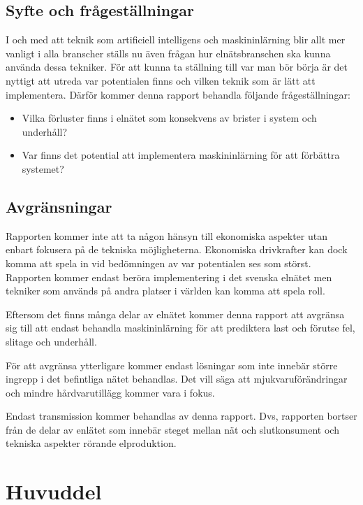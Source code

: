 \documentclass[a4paper]{article}
\begin{document}
\subsection{Syfte och frågeställningar}
I och med att teknik som artificiell intelligens och maskininlärning blir allt mer vanligt i alla branscher ställs nu även frågan hur elnätsbranschen ska kunna använda dessa tekniker. För att kunna ta ställning till var man bör börja är det nyttigt att utreda var potentialen finns och vilken teknik som är lätt att implementera. Därför kommer denna rapport behandla följande frågeställningar:

\begin{itemize}
	\item Vilka förluster finns i elnätet som konsekvens av brister i system och underhåll? \\
    \item Var finns det potential att implementera maskininlärning för att förbättra systemet?
\end{itemize}


\subsection{Avgränsningar}
Rapporten kommer inte att ta någon hänsyn till ekonomiska aspekter utan enbart fokusera på de tekniska möjligheterna. Ekonomiska drivkrafter kan dock komma att spela in vid bedömningen av var potentialen ses som störst. Rapporten kommer endast beröra implementering i det svenska elnätet men tekniker som används på andra platser i världen kan komma att spela roll. 

Eftersom det finns många delar av elnätet kommer denna rapport att avgränsa sig till att endast behandla maskininlärning för att prediktera last och förutse fel, slitage och underhåll.

För att avgränsa ytterligare kommer endast lösningar som inte innebär större ingrepp i det befintliga nätet behandlas. Det vill säga att mjukvaruförändringar och mindre hårdvarutillägg kommer vara i fokus.

Endast transmission kommer behandlas av denna rapport. Dvs, rapporten bortser från de delar av enlätet som innebär steget mellan nät och slutkonsument och tekniska aspekter rörande elproduktion.




\clearpage


\section{Huvuddel}
\end{document}
